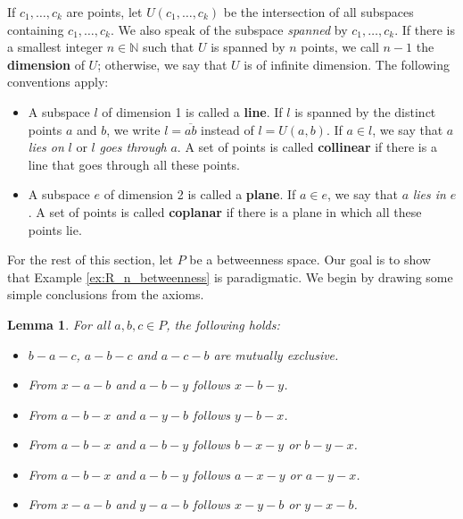 \documentclass[11pt,a4paper]{article}
\newcommand{\betw}[3]{#1 - #2 - #3}
\newcommand{\lineab}[1]{\overline{#1}}
\newtheorem{lemma}[theorem]{Lemma}
\begin{document}
If $c_1, \dots, c_k$ are points, let $U(c_1, \dots, c_k)$ be the intersection of all subspaces containing $c_1, \dots, c_k$. We also speak of the subspace \textit{spanned} by $c_1, \dots, c_k$. If there is a smallest integer $n \in \mathbb{N}$ such that $U$ is spanned by $n$ points, we call $n - 1$ the \textbf{dimension} of $U$; otherwise, we say that $U$ is of infinite dimension. The following conventions apply:
\begin{itemize}
    \item[(i)] A subspace $l$ of dimension 1 is called a \textbf{line}. If $l$ is spanned by the distinct points $a$ and $b$, we write $l = \lineab{ab}$ instead of $l = U(a, b)$.
    If $a \in l$, we say that $a$ \textit{lies on} $l$ or $l$ \textit{goes through} $a$. A set of points is called \textbf{collinear} if there is a line that goes through all these points.
    \item[(ii)] A subspace $e$ of dimension 2 is called a \textbf{plane}.
    If $a \in e$, we say that $a$ \textit{lies in} $e$. A set of points is called \textbf{coplanar} if there is a plane in which all these points lie.
\end{itemize}

For the rest of this section, let $P$ be a betweenness space. Our goal is to show that Example \ref{ex:R_n_betweenness} is paradigmatic.
We begin by drawing some simple conclusions from the axioms.

\begin{lemma} \label{lem:between_consequences}
For all $a, b, c \in P$, the following holds:
\begin{itemize}
    \item[(Z3')] $\betw{b}{a}{c}$, $\betw{a}{b}{c}$ and $\betw{a}{c}{b}$ are mutually exclusive.
    \item[(Z4')] From $\betw{x}{a}{b}$ and $\betw{a}{b}{y}$ follows $\betw{x}{b}{y}$.
    \item[(Z5')] From $\betw{a}{b}{x}$ and $\betw{a}{y}{b}$ follows $\betw{y}{b}{x}$.
    \item[(Z7')] From $\betw{a}{b}{x}$ and $\betw{a}{b}{y}$ follows $\betw{b}{x}{y}$ or $\betw{b}{y}{x}$.
    \item[(Z7'')] From $\betw{a}{b}{x}$ and $\betw{a}{b}{y}$ follows $\betw{a}{x}{y}$ or $\betw{a}{y}{x}$.
    \item[(Z7''')] From $\betw{x}{a}{b}$ and $\betw{y}{a}{b}$ follows $\betw{x}{y}{b}$ or $\betw{y}{x}{b}$.
\end{itemize}
\end{lemma}
\end{document}

